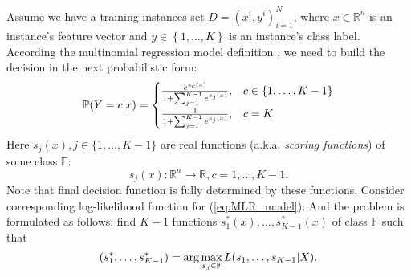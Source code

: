 \documentclass{article}
\begin{document}
Assume we have a training instances set $D={(x^i, y^i)}_{i=1}^N$,  where $x\in\mathbb{R}^n$ is an instance's feature vector
and $y\in\left\{ 1,\dots,K\right\} $ is an instance's class label. According the multinomial regression model definition \cite{GLM}, we need to build the decision in the next probabilistic form:
\begin{equation}
	\mathbb{P}(Y = c \arrowvert x) =
	\begin{cases}
		\frac{ e^{s_{c}(x)} }
			 { 1+\sum_{j=1}^{K-1} e^{s_{j}(x)} }
		, & c \in \{1, \ldots, K-1 \} \\

		\frac{ 1 }
			 { 1 + \sum_{j=1}^{K-1} e^{s_{j}(x)} }
		, & c=K
	\end{cases}\label{eq:MLR_model}
\end{equation}
Here $s_{j}(x), j \in \{ 1, \ldots, K-1 \}$ are real functions (a.k.a. \textit{scoring functions}) of some class $\mathbb{F}$:
\[
	s_{j}(x): \mathbb{R}^{n} \rightarrow \mathbb{R}, c=1, \dots, K-1.
\]
Note that final decision function is fully determined by these functions.
Consider corresponding log-likelihood function for (\ref{eq:MLR_model}):
And the problem is formulated as follows: find $K-1$ functions $s_{1}^{*}(x),\dots,s_{K-1}^{*}(x)$ of class $\mathbb{F}$ such that
\begin{equation}
(s_{1}^{*}, \dots, s_{K-1}^{*}) = \arg\max_{s_{j} \in \mathbb{F}} L(s_{1},\dots,s_{K-1}\arrowvert X).\label{eq:argmaxL}
\end{equation}
\end{document}
